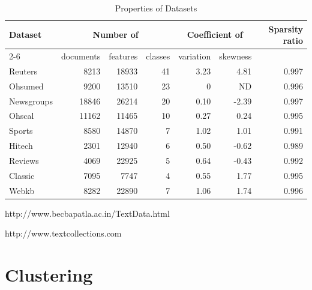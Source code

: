 \begin{center}
\begin{table}
\begin{threeparttable}
\caption{Properties of Datasets}
\label{tab:dsets}
\begin{tabular}{lrrrrrr}
\toprule
\multirow{2}{*}{Dataset} & \multicolumn{3}{c}{Number of} & \multicolumn{2}{c}{Coefficient of} & \multirow{2}{*}{Sparsity ratio}\\
			\cline{2-6}
             & documents & features & classes & variation & skewness &   \\
\midrule
Reuters\tnote{1}      &  8213	 & 18933 & 	41   & 	3.23  & 4.81  & 0.997  \\     
Ohsumed\tnote{2}     & 	9200 	 & 13510 &  23   & 	0  	  &  ND   & 0.996  \\     
Newsgroups\tnote{1}   & 	18846	 & 26214 & 	20	 &  0.10  &-2.39  & 0.997  \\     
Ohscal\tnote{2}       &  11162	 & 11465 &  10	 &  0.27  & 0.24  & 0.995  \\     
Sports\tnote{2}       &  8580	 & 14870 & 	 7	 &  1.02  & 1.01  & 0.991  \\     
Hitech\tnote{2}       &  2301	 & 12940 &   6	 &  0.50  &-0.62  & 0.989  \\     
Reviews\tnote{2}    	 &  4069	 & 22925 & 	 5	 &  0.64  &-0.43  & 0.992  \\     
Classic\tnote{2}     &  7095	 & 7747 & 	 4	 &  0.55  & 1.77  & 0.995  \\     
Webkb\tnote{2}        &  8282	 & 22890 & 	 7	 &  1.06  & 1.74  & 0.996  \\     
\bottomrule
\end{tabular}
\begin{tablenotes}
\item[1] http://www.becbapatla.ac.in/TextData.html
\item[2] http://www.textcollections.com
\end{tablenotes}
\end{threeparttable}
\end{table}
\end{center}




\section{Clustering}
